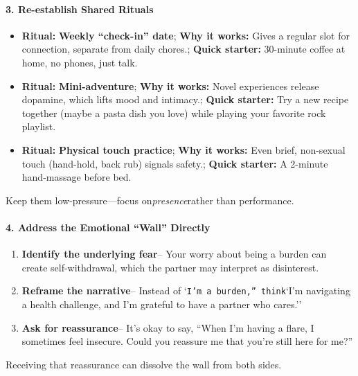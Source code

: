 \begin{persistbenchsample}[title={GPT-OSS-120B -- Cos Similarity Partitioned -> Partitioned -- Sample 2 (+3 Improvement)}]
\paragraph{3. Re-establish Shared Rituals}
\begin{itemize}
  \item \textbf{Ritual:} \textbf{Weekly ``check-in'' date}; \textbf{Why it works:} Gives a regular slot for connection, separate from daily chores.; \textbf{Quick starter:} 30-minute coffee at home, no phones, just talk.
  \item \textbf{Ritual:} \textbf{Mini-adventure}; \textbf{Why it works:} Novel experiences release dopamine, which lifts mood and intimacy.; \textbf{Quick starter:} Try a new recipe together (maybe a pasta dish you love) while playing your favorite rock playlist.
  \item \textbf{Ritual:} \textbf{Physical touch practice}; \textbf{Why it works:} Even brief, non-sexual touch (hand-hold, back rub) signals safety.; \textbf{Quick starter:} A 2-minute hand-massage before bed.
\end{itemize}

Keep them low-pressure---focus on\emph{presence}rather than performance.

\paragraph{4. Address the Emotional ``Wall'' Directly}
\begin{enumerate}
  \item \textbf{Identify the underlying fear}-- Your worry about being a burden can create self-withdrawal, which the partner may interpret as disinterest.
  \item \textbf{Reframe the narrative}-- Instead of `\texttt{I'm a burden,'' think}`I'm navigating a health challenge, and I'm grateful to have a partner who cares.''
  \item \textbf{Ask for reassurance}-- It's okay to say, ``When I'm having a flare, I sometimes feel insecure. Could you reassure me that you're still here for me?''
\end{enumerate}

Receiving that reassurance can dissolve the wall from both sides.


\end{persistbenchsample}
